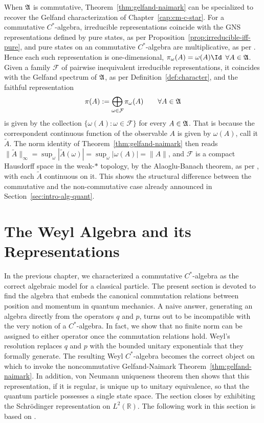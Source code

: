 \begin{remark}
	\label{rem:commutative-recovery}
	When $\mathfrak{A}$ is commutative, Theorem~\ref{thm:gelfand-naimark} can be specialized to recover the Gelfand characterization of Chapter~\ref{cap:cm-c-star}. For a commutative $C^*$-algebra, irreducible representations coincide with the GNS representations defined by pure states, as per Proposition~\ref{prop:irreducible-iff-pure}, and pure states on an commutative $C^*$-algebra are multiplicative, as per \cite[Prop.~2.6.3]{strocchiIntroductionMathematicalStructure2005}. Hence each such representation is one-dimensional, $\pi_\omega(A) = \omega(A)\Id$ $\forall A \in \mathfrak{A}$. Given a family $\mathcal F$ of pairwise inequivalent irreducible representations, it coincides with the Gelfand spectrum of $\mathfrak{A}$, as per Definition~\ref{def:character}, and the faithful representation 
	\[\pi(A) := \bigoplus_{\omega\in\mathcal F}\pi_\omega(A) \qquad \forall A \in \A\]
	is given by the collection $\{\omega(A) : \omega\in\mathcal F\}$ for every $A \in \mathfrak{A}$. That is because the correspondent continuous function of the observable $A$ is given by $\omega(A)$, call it $\widetilde A$. The norm identity of Theorem~\ref{thm:gelfand-naimark} then reads $\|\widetilde A\|_\infty = \sup_\omega|\widetilde A(\omega)| = \sup_\omega|\omega(A)| = \|A\|$, and $\mathcal F$ is a compact Hausdorff space in the weak-$*$ topology, by the Alaoglu-Banach theorem, as per \cite[Theorem IV.21]{reedMethodsModernMathematical2003}, with each $\widetilde A$ continuous on it. This shows the structural difference between the commutative and the non-commutative case already announced in Section~\ref{sec:intro-alg-quant}. 
\end{remark}

	\section{The Weyl Algebra and its Representations}
	
	In the previous chapter, we characterized a commutative $C^*$-algebra as the correct algebraic model for a classical particle. The present section is devoted to find the algebra that embeds the canonical commutation relations between position and momentum in quantum mechanics. A naive answer, generating an algebra directly from the operators $q$ and $p$, turns out to be incompatible with the very notion of a $C^*$-algebra. In fact, we show that no finite norm can be assigned to either operator once the commutation relations hold. Weyl's resolution replaces $q$ and $p$ with the bounded unitary exponentials that they formally generate. The resulting Weyl $C^*$-algebra becomes the correct object on which to invoke the noncommutative Gelfand-Naimark Theorem~\ref{thm:gelfand-naimark}. In addition, von Neumann uniqueness theorem then shows that this representation, if it is regular, is unique up to unitary equivalence, so that the quantum particle possesses a single state space. The section closes by exhibiting the Schr\"odinger representation on $L^2(\mathbb{R})$. The following work in this section is based on \cite[Chapter 3]{strocchiIntroductionMathematicalStructure2005}.
	
